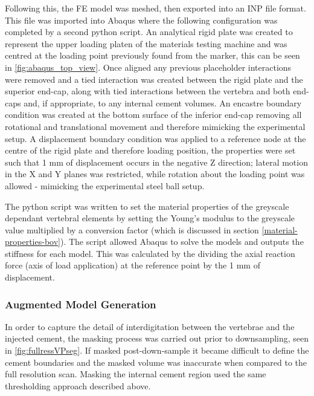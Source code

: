 Following this, the FE model was meshed, then exported into an INP file format.
This file was imported into Abaqus where the following configuration was
completed by a second python script. An analytical rigid plate was created to
represent the upper loading platen of the materials testing machine and was
centred at the loading point previously found from the marker, this can be seen
in \cref{fig:abaqus_top_view}. Once aligned any previous placeholder
interactions were removed and a tied interaction was created between the rigid
plate and the superior end-cap, along with tied interactions between the
vertebra and both end-caps and, if appropriate, to any internal cement volumes.
An encastre boundary condition was created at the bottom surface of the
inferior end-cap removing all rotational and translational movement and
therefore mimicking the experimental setup. A displacement boundary condition
was applied to a reference node at the centre of the rigid plate and therefore
loading position, the properties were set such that 1 mm of displacement occurs
in the negative Z direction; lateral motion in the X and Y planes was
restricted, while rotation about the loading point was allowed - 
mimicking the experimental steel ball setup.

The python script was written to set the material properties of the greyscale
dependant vertebral elements by setting the Young's modulus to the greyscale
value multiplied by a conversion factor (which is discussed in section
\cref{material-properties-bov}). The script allowed Abaqus to solve the models
and outputs the stiffness for each model. This was calculated by the dividing
the axial reaction force (axis of load application) at the reference point by
the  1 mm of displacement.

\subsubsection{Augmented Model Generation}

In order to capture the detail of interdigitation between the
vertebrae and the injected cement, the masking process was carried out prior to
downsampling, seen in \cref{fig:fullressVPseg}. If masked post-down-sample it
became difficult to define the cement boundaries and the masked volume was
inaccurate when compared to the full resolution scan. Masking the internal
cement region used the same thresholding approach described above.


